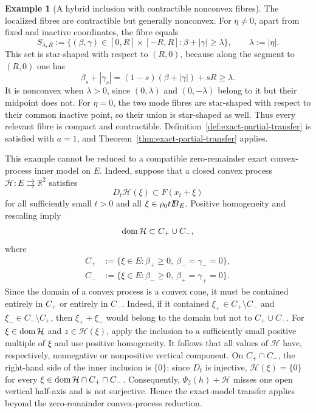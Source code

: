 \documentclass[11pt]{amsart}
\theoremstyle{definition}
\newtheorem{example}[theorem]{Example}
\theoremstyle{remark}
\newcommand{\tto}{\rightrightarrows}
\newcommand{\domm}{\mathop{\rm dom}\nolimits}
\def\ball{{I\kern -.35em B}}
\begin{document}
\begin{example}[A hybrid inclusion with contractible nonconvex fibres]
		The localized fibres are contractible but generally nonconvex. For
		$\eta\ne0$, apart from fixed and inactive coordinates, the fibre equals
		$$
		S_{\lambda,R}
		:=
		\{(\beta,\gamma)\in[0,R]\times[-R,R]:
		\beta+|\gamma|\ge\lambda\},
		\qquad
		\lambda:=|\eta|.
		$$
		This set is star-shaped with respect to $(R,0)$, because along the segment
		to $(R,0)$ one has
		$$
		\beta_s+|\gamma_s|
		=
		(1-s)(\beta+|\gamma|)+sR
		\ge\lambda.
		$$
		It is nonconvex when $\lambda>0$, since $(0,\lambda)$ and
		$(0,-\lambda)$ belong to it but their midpoint does not. For $\eta=0$,
		the two mode fibres are star-shaped with respect to their common inactive
		point, so their union is star-shaped as well. Thus every relevant fibre
		is compact and contractible. Definition~\ref{def:exact-partial-transfer}
		is satisfied with $a=1$, and Theorem~\ref{thm:exact-partial-transfer}
		applies.
		
		This example cannot be reduced to a compatible zero-remainder exact
		convex-process inner model on $E$. Indeed, suppose that a closed convex
		process $\mathcal H:E\tto\mathbb R^2$ satisfies
		$$
		D_t\mathcal H(\xi)\subset F(x_t+\xi)
		$$
		for all sufficiently small $t>0$ and all
		$\xi\in\rho_0t\ball_E$. Positive homogeneity and rescaling imply
		$$
		\domm\mathcal H\subset C_+\cup C_-,
		$$
		where
		$$
		\begin{aligned}
			C_+&:=\{\xi\in E:\beta_+\ge0,\ \beta_-=\gamma_-=0\},\\
			C_-&:=\{\xi\in E:\beta_-\ge0,\ \beta_+=\gamma_+=0\}.
		\end{aligned}
		$$
		Since the domain of a convex process is a convex cone, it must be
		contained entirely in $C_+$ or entirely in $C_-$. Indeed, if it contained
		$\xi_+\in C_+\setminus C_-$ and $\xi_-\in C_-\setminus C_+$, then
		$\xi_++\xi_-$ would belong to the domain but not to $C_+\cup C_-$.
		For $\xi\in\domm\mathcal H$ and $z\in\mathcal H(\xi)$, apply the
		inclusion to a sufficiently small positive multiple of $\xi$ and use
		positive homogeneity. It follows that all values of $\mathcal H$ have,
		respectively, nonnegative or nonpositive vertical component. On
		$C_+\cap C_-$, the right-hand side of the inner inclusion is $\{0\}$;
		since $D_t$ is injective, $\mathcal H(\xi)=\{0\}$ for every
		$\xi\in\domm\mathcal H\cap C_+\cap C_-$. Consequently,
		$\Psi_2(h)+\mathcal H$ misses one open vertical half-axis and is not
		surjective. Hence the exact-model transfer applies beyond the
		zero-remainder convex-process reduction.
	\end{example}
	
\end{document}
